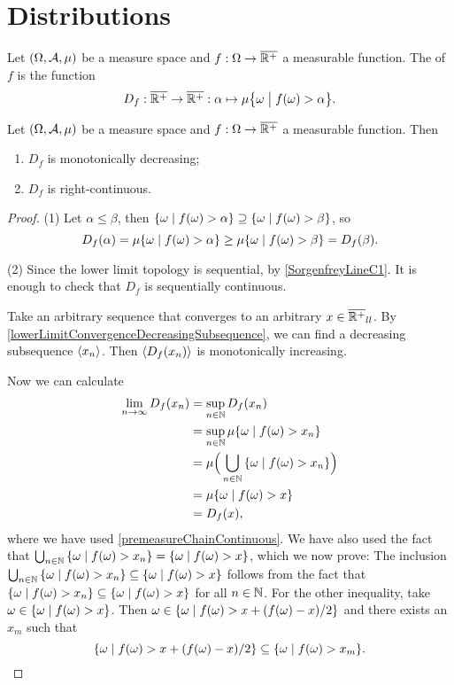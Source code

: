 \section{Distributions}
\begin{definition}
Let $\sSet{\Omega, \mathcal{A}, \mu}$ be a measure space and $f: \Omega\to \overline{\mathbb{R}^+}$ a measurable function. The  of $f$ is the function
\[ D_f: \overline{\R^+}\to \overline{\R^+}: \alpha \mapsto \mu\setbuilder[\big]{\omega}{f(\omega)>\alpha}.  \]
\end{definition}

\begin{lemma} \label{distributionContinuity}
Let $\sSet{\Omega, \mathcal{A}, \mu}$ be a measure space and $f: \Omega\to \overline{\mathbb{R}^+}$ a measurable function. Then
\begin{enumerate}
\item $D_f$ is monotonically decreasing;
\item $D_f$ is right-continuous.
\end{enumerate}
\end{lemma}
\begin{proof}
(1) Let $\alpha \leq \beta$, then $\setbuilder{\omega}{f(\omega) > \alpha} \supseteq \setbuilder{\omega}{f(\omega) > \beta}$, so
\[ D_f(\alpha) = \mu\setbuilder{\omega}{f(\omega) > \alpha} \geq \mu\setbuilder{\omega}{f(\omega) > \beta} = D_f(\beta). \]


(2) Since the lower limit topology is sequential, by \ref{SorgenfreyLineC1}. It is enough to check that $D_f$ is sequentially continuous.


Take an arbitrary sequence that converges to an arbitrary $x\in\overline{\mathbb{R}^+}_{ll}$. By \ref{lowerLimitConvergenceDecreasingSubsequence}, we can find a decreasing subsequence $\left\langle x_n \right\rangle$. Then $\left\langle D_f(x_n) \right\rangle$ is monotonically increasing.

Now we can calculate
\begin{align*}
\lim_{n\to\infty} D_f(x_n) &= \sup_{n\in\N}D_f(x_n) \\
&= \sup_{n\in\N} \mu\setbuilder{\omega}{f(\omega) > x_n} \\
&= \mu\Big(\bigcup_{n\in\N}\setbuilder{\omega}{f(\omega) > x_n}\Big) \\
&= \mu\setbuilder{\omega}{f(\omega) > x} \\
&= D_f(x),
\end{align*}
where we have used \ref{premeasureChainContinuous}. We have also used the fact that $\bigcup_{n\in\N}\setbuilder{\omega}{f(\omega) > x_n} = \setbuilder{\omega}{f(\omega) > x}$, which we now prove:
The inclusion $\bigcup_{n\in\N}\setbuilder{\omega}{f(\omega) > x_n} \subseteq \setbuilder{\omega}{f(\omega) > x}$ follows from the fact that $\setbuilder{\omega}{f(\omega) > x_n} \subseteq \setbuilder{\omega}{f(\omega) > x}$ for all $n\in \mathbb{N}$. For the other inequality, take $\omega \in \setbuilder{\omega}{f(\omega) > x}$. Then $\omega \in \setbuilder{\omega}{f(\omega) > x+(f(\omega)-x)/2}$ and there exists an $x_m$ such that
\[ \setbuilder{\omega}{f(\omega) > x+(f(\omega)-x)/2} \subseteq \setbuilder{\omega}{f(\omega) > x_m}. \] 
\end{proof}

